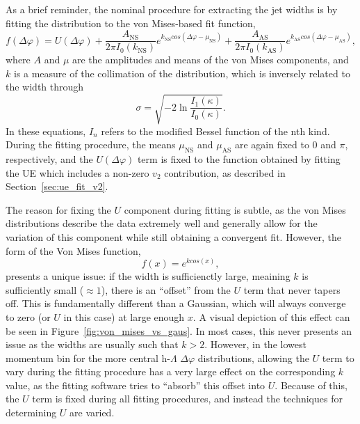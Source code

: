 As a brief reminder, the nominal procedure for extracting the jet widths is by fitting the \dphi distribution to the von Mises-based fit function,
%
\begin{equation}
    \label{eq:von_mises_ref}
    f(\Delta\varphi) = U(\Delta\varphi) + \frac{A_{\text{NS}}}{2\pi I_0(k_{\text{NS}})} e^{k_{\text{NS}}cos(\Delta\varphi - \mu_{\text{NS}})} + \frac{A_{\text{AS}}}{2\pi I_0(k_{\text{AS}})} e^{k_{\text{AS}}cos(\Delta\varphi - \mu_{\text{AS}})},
\end{equation}
%
where $A$ and $\mu$ are the amplitudes and means of the von Mises components, and $k$ is a measure of the collimation of the distribution, which is inversely related to the width through
%
\begin{equation}
    \label{eq:kappa_to_sigma_ref}
    \sigma = \sqrt{-2\ln\frac{I_{1}(\kappa)}{I_{0}(\kappa)}}.
\end{equation}
%
In these equations, $I_n$ refers to the modified Bessel function of the nth kind. During the fitting procedure, the means $\mu_{\text{NS}}$ and $\mu_{\text{AS}}$ are again fixed to 0 and $\pi$, respectively, and the $U(\Delta\varphi)$ term is fixed to the function obtained by fitting the UE which includes a non-zero $v_{2}$ contribution, as described in Section~\ref{sec:ue_fit_v2}.

The reason for fixing the $U$ component during fitting is subtle, as the von Mises distributions describe the data extremely well and generally allow for the variation of this component while still obtaining a convergent fit. However, the form of the Von Mises function,
%
\begin{equation}
    \label{eq:von_mises_form}
    f(x) = e^{k cos(x)},
\end{equation}
%
 presents a unique issue: if the width is sufficienctly large, meaining $k$ is sufficiently small ($\approx 1$), there is an ``offset'' from the $U$ term that never tapers off. This is fundamentally different than a Gaussian, which will always converge to zero (or $U$ in this case) at large enough $x$. A visual depiction of this effect can be seen in Figure~\ref{fig:von_mises_vs_gaus}. In most cases, this never presents an issue as the widths are usually such that $k > 2$. However, in the lowest momentum bin for the more central h-$\Lambda$ $\Delta\varphi$ distributions, allowing the $U$ term to vary during the fitting procedure has a very large effect on the corresponding $k$ value, as the fitting software tries to ``absorb'' this offset into $U$. Because of this, the $U$ term is fixed during all fitting procedures, and instead the techniques for determining $U$ are varied. 

